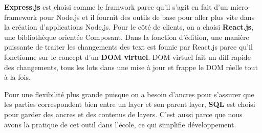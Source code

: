 \textbf{Express.js} est choisi comme le framwork parce qu'il s'agit en fait d'un micro-framework pour Node.js et il fournit des outils de base pour aller plus vite dans la création d'applications Node.js. Pour le côté de clients, on a choisi \textbf{React.js}, une bibliothèque orientée Composant. Dans la fonction d'édition, une manière puissante de traiter les changements des text est founie par React.js parce qu'il fonctionne sur le concept d'un \textbf{DOM virtuel}. DOM virtuel fait un diff rapide des changements, tous les lots dans une mise à jour et frappe le DOM réelle tout à la fois. 

Pour une flexibilité plus grande puisque on a besoin d'ancres pour s'assurer que les parties correspondent bien entre un layer et son parent layer, \textbf{SQL} est choisi pour garder des ancres et des contenus de layers. C'est aussi parce que nous avons la pratique de cet outil dans l'école, ce qui simplifie développement. 